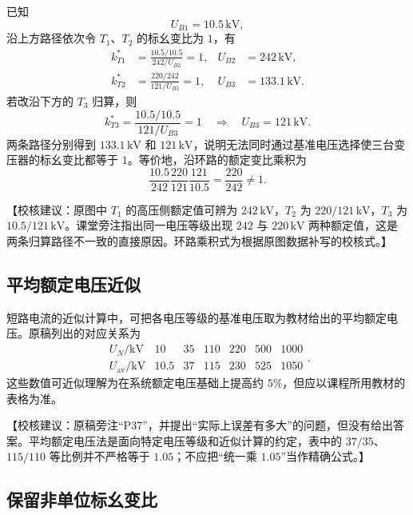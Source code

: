 \documentclass[
  12pt,
  UTF8,
  a4paper,
  fontset=fandol,
  oneside,
  openany
]{ctexrep}
\newcommand{\reviewnote}[1]{%
  \par\smallskip
  {\color{reviewgray}\small\noindent【校核建议：#1】\par}
  \smallskip
}
\begin{document}
已知
\begin{equation}
  U_{B1}=10.5\,\mathrm{kV},
\end{equation}
沿上方路径依次令 $T_1$、$T_2$ 的标幺变比为 $1$，有
\begin{align}
  k_{T1}^*
  & =\frac{10.5/10.5}{242/U_{B2}}=1,
  & U_{B2} & =242\,\mathrm{kV}, \\
  k_{T2}^*
  & =\frac{220/242}{121/U_{B3}}=1,
  & U_{B3} & =133.1\,\mathrm{kV}.
\end{align}
若改沿下方的 $T_3$ 归算，则
\begin{equation}
  k_{T3}^*
  =\frac{10.5/10.5}{121/U_{B3}}=1
  \quad\Longrightarrow\quad
  U_{B3}=121\,\mathrm{kV}.
\end{equation}
两条路径分别得到 $133.1\,\mathrm{kV}$ 和 $121\,\mathrm{kV}$，说明无法同时通过基准电压选择使三台变压器的标幺变比都等于 $1$。等价地，沿环路的额定变比乘积为
\begin{equation}
  \frac{10.5}{242}
  \frac{220}{121}
  \frac{121}{10.5}
  =\frac{220}{242}\ne1.
\end{equation}

\reviewnote{原图中 $T_1$ 的高压侧额定值可辨为 $242\,\mathrm{kV}$，$T_2$ 为 $220/121\,\mathrm{kV}$，$T_3$ 为 $10.5/121\,\mathrm{kV}$。课堂旁注指出同一电压等级出现 $242$ 与 $220\,\mathrm{kV}$ 两种额定值，这是两条归算路径不一致的直接原因。环路乘积式为根据原图数据补写的校核式。}

\subsection{平均额定电压近似}

短路电流的近似计算中，可把各电压等级的基准电压取为教材给出的平均额定电压。原稿列出的对应关系为
\begin{equation}
  \begin{array}{c|rrrrrr}
    U_N/\mathrm{kV}
      & 10 & 35 & 110 & 220 & 500 & 1000 \\
    \hline
    U_{\mathrm{av}}/\mathrm{kV}
      & 10.5 & 37 & 115 & 230 & 525 & 1050
  \end{array}.
\end{equation}
这些数值可近似理解为在系统额定电压基础上提高约 $5\%$，但应以课程所用教材的表格为准。

\reviewnote{原稿旁注“P37”，并提出“实际上误差有多大”的问题，但没有给出答案。平均额定电压法是面向特定电压等级和近似计算的约定，表中的 $37/35$、$115/110$ 等比例并不严格等于 $1.05$；不应把“统一乘 $1.05$”当作精确公式。}

\subsection{保留非单位标幺变比}
\end{document}

